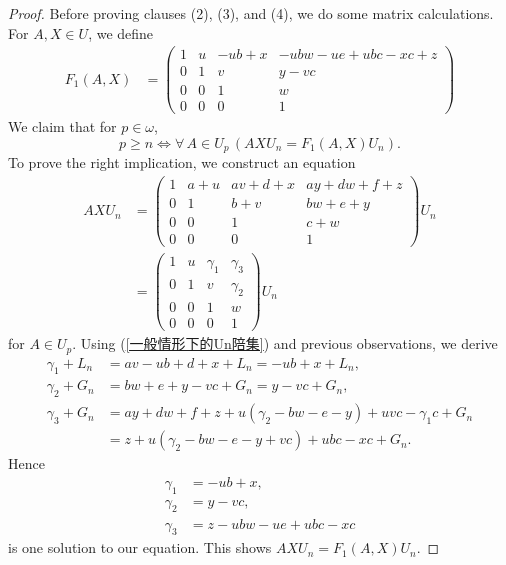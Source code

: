 \documentclass[11pt]{amsart}
\theoremstyle{definition}
\theoremstyle{remark}
\numberwithin{equation}{section}
\begin{document}
\begin{proof}
Before proving clauses (2), (3), and (4), we do some matrix calculations. For $A,X\in U$, we define
    \begin{align*}
        F_1(A,X)&=\begin{pmatrix}
            1 & u & - u b + x & -ubw-ue+ubc-xc+z\\
            0 & 1 & v & y - v c\\
            0 & 0 & 1 & w\\
            0 & 0 & 0 & 1
        \end{pmatrix}
    \end{align*}
    We claim that for $p\in\omega$,
    \begin{equation}\label{矩阵等式不改变uvw的等价条件}
        p\geq n\iff\forall\,A\in U_p\,(AXU_n=F_1(A,X)U_n).
    \end{equation}
    To prove the right implication, we construct an equation
    \begin{align*}
        AXU_n&=\begin{pmatrix}
            1 & a+u & a v + d + x & a y + d w + f + z\\
            0 & 1 & b+v & b w + e + y\\
            0 & 0 & 1 & c + w\\
            0 & 0 & 0 & 1
        \end{pmatrix}U_n\\
        &=\begin{pmatrix}
            1 & u & \gamma_1 & \gamma_3\\
            0 & 1 & v & \gamma_2\\
            0 & 0 & 1 & w\\
            0 & 0 & 0 & 1
        \end{pmatrix}U_n
    \end{align*}
    for $A\in U_p$. Using (\ref{一般情形下的Un陪集}) and previous observations, we derive
    \begin{align*}
        \gamma_1+L_n&=av-ub+d+x+L_n=-ub+x+L_n,\\
        \gamma_2+G_n&=bw+e+y-vc+G_n=y-vc+G_n,\\
        \gamma_3+G_n&=ay+dw+f+z+u(\gamma_2-bw-e-y)+uvc-\gamma_1c+G_n\\
        &=z+u(\gamma_2-bw-e-y+vc)+ubc-xc+G_n.
    \end{align*}
    Hence
    \begin{align*}
        \gamma_1&=-ub+x,\\
        \gamma_2&=y-vc,\\
        \gamma_3&=z-ubw-ue+ubc-xc
    \end{align*}
    is one solution to our equation. This shows $AXU_n=F_1(A,X)U_n$.


\end{proof}
\end{document}
